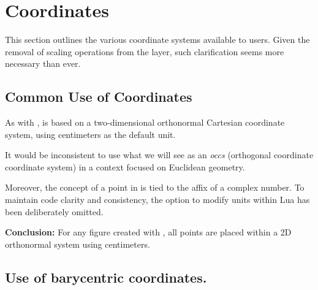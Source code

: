 \newpage\section{Coordinates}

This section outlines the various coordinate systems available to users. Given the removal of scaling operations from the  layer, such clarification seems more necessary than ever.

\subsection{Common Use of Coordinates}
As with ,  is based on a two-dimensional orthonormal Cartesian coordinate system, using centimeters as the default unit.

It would be inconsistent to use what we will see  as an \emph{occs} (orthogonal coordinate coordinate system) in a context focused on Euclidean geometry.

Moreover, the concept of a point in  is tied to the affix of a complex number. To maintain code clarity and consistency, the option to modify units within Lua has been deliberately omitted.

\medskip

\textbf{Conclusion:} For any figure created with , all points are placed within a 2D orthonormal system using centimeters.


\subsection{Use of barycentric coordinates.}

